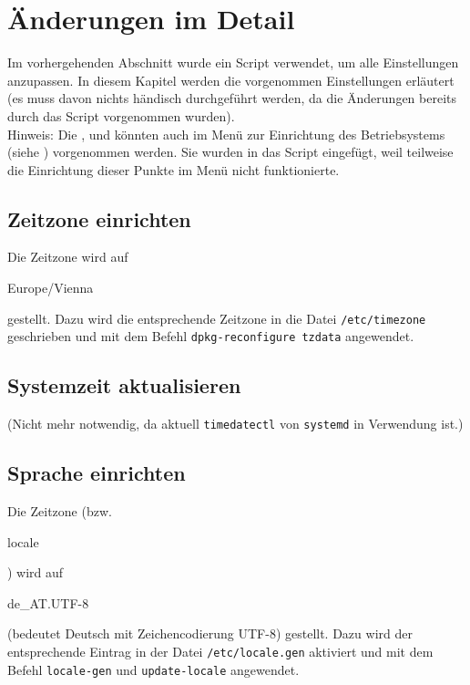 \section{Änderungen im Detail}
Im vorhergehenden Abschnitt wurde ein Script verwendet, um alle Einstellungen anzupassen.
In diesem Kapitel werden die vorgenommen Einstellungen erläutert (es muss davon nichts händisch durchgeführt werden, da die Änderungen bereits durch das Script vorgenommen wurden).\\
Hinweis: Die ,  und  könnten auch im Menü zur Einrichtung des Betriebsystems (siehe ) vorgenommen werden.
Sie wurden in das Script eingefügt, weil teilweise die Einrichtung dieser Punkte im Menü nicht funktionierte.

\subsection{Zeitzone einrichten}
\label{sec:zeitzone}
Die Zeitzone wird auf \begin{em}Europe/Vienna\end{em} gestellt.
Dazu wird die entsprechende Zeitzone in die Datei \lstinline|/etc/timezone| geschrieben und mit dem Befehl \lstinline|dpkg-reconfigure tzdata| angewendet.

\subsection{Systemzeit aktualisieren}
\label{sec:zeitsync}
(Nicht mehr notwendig, da aktuell \lstinline|timedatectl| von \lstinline|systemd| in Verwendung ist.)

\subsection{Sprache einrichten}
\label{sec:sprache}
Die Zeitzone (bzw. \begin{em}locale\end{em}) wird auf \begin{em}de\_AT.UTF-8\end{em} (bedeutet Deutsch mit Zeichencodierung UTF-8) gestellt.
Dazu wird der entsprechende Eintrag in der Datei \lstinline|/etc/locale.gen| aktiviert und mit dem Befehl \lstinline|locale-gen| und \lstinline|update-locale| angewendet.

